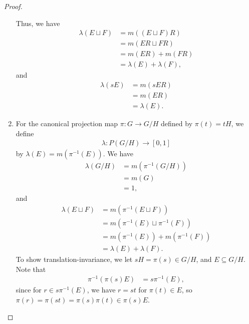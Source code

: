 \documentclass[10pt]{mypackage}
\begin{document}
\begin{proof}
\begin{enumerate}[(1)]
      Thus, we have
      \begin{align*}
        \lambda\left(E\sqcup F\right) &= m\left(\left(E\sqcup F\right)R\right)\\
                                      &= m\left(ER\sqcup FR\right)\\
                                      &= m\left(ER\right) + m\left(FR\right)\\
                                      &= \lambda(E) + \lambda(F),
      \end{align*}
      and
      \begin{align*}
        \lambda\left(sE\right) &= m\left(sER\right)\\
                               &= m\left(ER\right)\\
                               &= \lambda\left(E\right).
      \end{align*}
    \item For the canonical projection map $\pi\colon G\rightarrow G/H$ defined by $\pi(t) = tH$, we define
      \begin{align*}
        \lambda\colon P\left(G/H\right)\rightarrow [0,1]
      \end{align*}
      by $\lambda\left(E\right) = m\left(\pi^{-1}\left(E\right)\right)$. We have
      \begin{align*}
        \lambda\left(G/H\right) &= m\left(\pi^{-1}\left(G/H\right)\right)\\
                                &= m\left(G\right)\\
                                &= 1,
      \end{align*}
      and
      \begin{align*}
        \lambda\left(E\sqcup F\right) &= m\left(\pi^{-1}\left(E\sqcup F\right)\right)\\
                                      &= m\left(\pi^{-1}\left(E\right)\sqcup \pi^{-1}\left(F\right)\right)\\
                                      &= m\left(\pi^{-1}\left(E\right)\right) + m\left(\pi^{-1}\left(F\right)\right)\\
                                      &= \lambda\left(E\right) + \lambda\left(F\right).
      \end{align*}
      To show translation-invariance, we let $sH = \pi\left(s\right)\in G/H$, and $E\subseteq G/H$. Note that
      \begin{align*}
        \pi^{-1}\left(\pi\left(s\right)E\right) &= s\pi^{-1}\left(E\right),
      \end{align*}
      since for $r\in s\pi^{-1}\left(E\right)$, we have $r = st$ for $\pi(t)\in E$, so $\pi\left(r\right) = \pi\left(st\right) = \pi\left(s\right)\pi\left(t\right) \in \pi\left(s\right)E$.\newline


\end{enumerate}
\end{proof}
\end{document}
